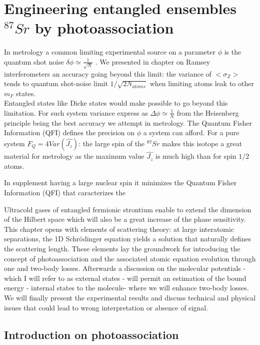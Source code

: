 ﻿%

\chapter{Engineering entangled ensembles $^{87}Sr$ by photoassociation}
In metrology a common limiting experimental source on a parameter $\phi$ is the quantum shot noise $\delta \phi \simeq \frac{1}{\sqrt{N}}$ \cite{pezze_quantum_2014}.
We presented in chapter on Ramsey interferometers an accuracy going beyond this limit: the variance of $<\sigma_Z>$ 
tends to quantum shot-noise limit $1/\sqrt{2N_{atoms}}$ when limiting atoms leak to other $m_F$ states. \\
Entangled states like Dicke states would make possible to go beyond this limitation. For such system variance 
express as $\Delta \phi \simeq \frac{1}{N}$ from
the Heisenberg principle being the best accuracy we attempt in metrology.
The Quantum Fisher Information (QFI) defines the precision on $\phi$ a system can afford. For a pure system $F_Q=4Var(\hat{J_z})$:
the large spin of the $^{87}Sr$ makes this isotope a great material for metrology as the maximum value $\hat{J_z}$ is much high than
for spin $1/2$ atoms.  

In supplement  having a large nuclear spin it minimizes the Quantum Fisher Information (QFI) that caracterizes the

Ultracold gases of entangled fermionic strontium enable to extend the dimension of the Hilbert space which will 
also be a great increase of the phase sensitivity. \\

This chapter opens with elements of scattering theory: at large interatomic separations, the 1D Schr\"odinger equation 
yields a solution that naturally defines the scattering length. These elements lay the groundwork for 
introducing the concept of photoassociation and the associated atomic equation evolution through one and two-body losses.
Afterwards a discussion on the molecular potentials - which I will refer to as external states - will permit an estimation of 
the bound energy - internal states to the molecule- where we will enhance two-body losses. We will finally present the experimental results and discuss technical and physical issues that could
lead to wrong interpretation or absence of signal.

\section{Introduction on photoassociation}
